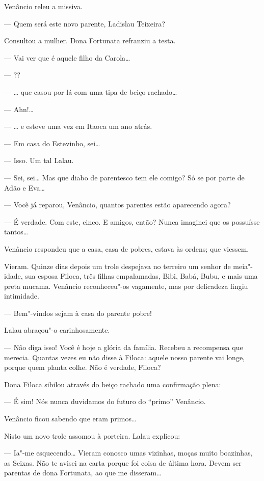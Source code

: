 Venâncio releu a missiva.

--- Quem será este novo parente, Ladislau Teixeira?

Consultou a mulher. Dona Fortunata refranziu a testa.

--- Vai ver que é aquele filho da Carola\ldots{}

--- ??

--- \ldots{} que casou por lá com uma tipa de beiço rachado\ldots{}

--- Ahn!\ldots{}

--- \ldots{} e esteve uma vez em Itaoca um ano atrás.

--- Em casa do Estevinho, sei\ldots{}

--- Isso. Um tal Lalau.

--- Sei, sei\ldots{} Mas que diabo de parentesco tem ele comigo? Só se por
parte de Adão e Eva\ldots{}

--- Você já reparou, Venâncio, quantos parentes estão aparecendo agora?

--- É verdade. Com este, cinco. E amigos, então? Nunca imaginei que os
possuísse tantos\ldots{}

Venâncio respondeu que a casa, casa de pobres, estava às ordens; que
viessem.

Vieram. Quinze dias depois um trole despejava no terreiro um senhor de
meia"-idade, sua esposa Filoca, três filhas empalamadas, Bibi, Babá,
Bubu, e mais uma preta mucama. Venâncio reconheceu"-os vagamente, mas por
delicadeza fingiu intimidade.

--- Bem"-vindos sejam à casa do parente pobre!

Lalau abraçou"-o carinhosamente.

--- Não diga isso! Você é hoje a glória da família. Recebeu a recompensa
que merecia. Quantas vezes eu não disse à Filoca: aquele nosso parente
vai longe, porque quem planta colhe. Não é verdade, Filoca?

Dona Filoca sibilou através do beiço rachado uma confirmação plena:

--- É sim! Nós nunca duvidamos do futuro do ``primo'' Venâncio.

Venâncio ficou sabendo que eram primos\ldots{}

Nisto um novo trole assomou à porteira. Lalau explicou:

--- Ia"-me esquecendo\ldots{} Vieram conosco umas vizinhas, moças muito
boazinhas, as Seixas. Não te avisei na carta porque foi coisa de última
hora. Devem ser parentas de dona Fortunata, ao que me disseram\ldots{}

